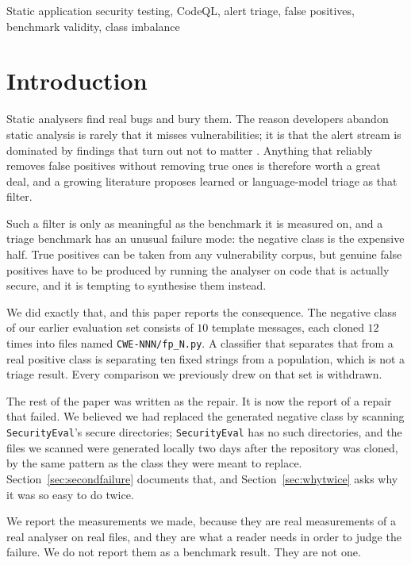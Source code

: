 \documentclass[journal]{IEEEtran}
\providecommand{\citep}[1]{\cite{#1}}
\theoremstyle{definition}
\begin{document}
\begin{IEEEkeywords}
Static application security testing, CodeQL, alert triage, false positives, benchmark validity, class imbalance
\end{IEEEkeywords}

\section{Introduction}
\label{sec:intro}

Static analysers find real bugs and bury them. The reason developers abandon
static analysis is rarely that it misses vulnerabilities; it is that the alert
stream is dominated by findings that turn out not to matter
\citep{johnson2013why}. Anything that reliably removes false positives without
removing true ones is therefore worth a great deal, and a growing literature
proposes learned or language-model triage as that filter.

Such a filter is only as meaningful as the benchmark it is measured on, and a
triage benchmark has an unusual failure mode: the negative class is the
expensive half. True positives can be taken from any vulnerability corpus, but
genuine false positives have to be produced by running the analyser on code that
is actually secure, and it is tempting to synthesise them instead.

We did exactly that, and this paper reports the consequence. The negative class
of our earlier evaluation set consists of $10$ template messages, each cloned
$12$ times into files named \texttt{CWE-\allowbreak{}NNN/\allowbreak{}fp\_\allowbreak{}N.\allowbreak{}py}. A classifier that
separates that from a real positive class is separating ten fixed strings from a
population, which is not a triage result. Every comparison we previously drew on
that set is withdrawn.

The rest of the paper was written as the repair. It is now the report of a
repair that failed. We believed we had replaced the generated negative class by
scanning \texttt{SecurityEval}'s secure directories; \texttt{SecurityEval} has no
such directories, and the files we scanned were generated locally two days after
the repository was cloned, by the same pattern as the class they were meant to
replace. Section~\ref{sec:secondfailure} documents that, and
Section~\ref{sec:whytwice} asks why it was so easy to do twice.

We report the measurements we made, because they are real measurements of a real
analyser on real files, and they are what a reader needs in order to judge the
failure. We do not report them as a benchmark result. They are not one.
\end{document}
